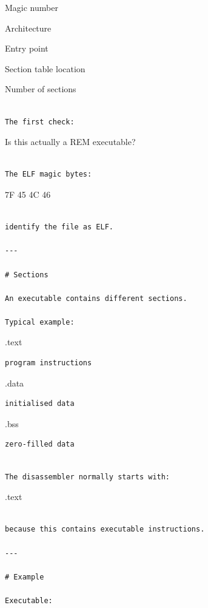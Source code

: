 \documentclass[
  oneside,
  openany]{book}
\begin{document}
Magic number

Architecture

Entry point

Section table location

Number of sections

\begin{verbatim}

The first check:
\end{verbatim}

Is this actually a REM executable?

\begin{verbatim}

The ELF magic bytes:
\end{verbatim}

7F 45 4C 46

\begin{verbatim}

identify the file as ELF.

---

# Sections

An executable contains different sections.

Typical example:
\end{verbatim}

.text

\begin{verbatim}
program instructions
\end{verbatim}

.data

\begin{verbatim}
initialised data
\end{verbatim}

.bss

\begin{verbatim}
zero-filled data
\end{verbatim}

\begin{verbatim}

The disassembler normally starts with:
\end{verbatim}

.text

\begin{verbatim}

because this contains executable instructions.

---

# Example

Executable:
\end{verbatim}
\end{document}
